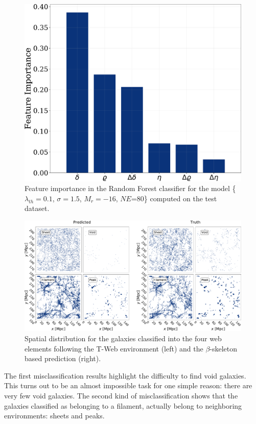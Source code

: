 \documentclass[usenatbib]{mnras}
\begin{document}
\begin{figure}
    \includegraphics[scale=0.29]{Figs/p_features_importance_test.pdf}
    \caption{
      Feature importance in the Random Forest classifier for the model
      \{$\lambda_{th}=0.1$, $\sigma=1.5$, $M_r=-16$,
      $NE$=80\} computed on the test dataset.}
    \label{fig:feature_importance}
\end{figure}

\begin{figure}
  \centering 
    \includegraphics[scale=0.28]{Figs/p_environment_predicted.pdf}
    \caption{Spatial distribution for the galaxies classified into the
      four web elements following the T-Web environment (left) and 
      the $\beta$-skeleton based prediction (right).} 
    \label{fig:prediction}
\end{figure}

The first misclassification results highlight the difficulty to find void galaxies.
This turns out to be an almost impossible task for one simple reason:
there are very few void galaxies.
The second kind of misclassification shows that the galaxies
classified as belonging to a filament, actually belong to neighboring
environments: sheets and peaks.
\end{document}
